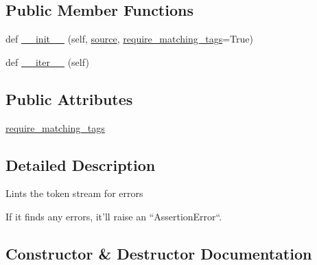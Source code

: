 \subsection*{Public Member Functions}
\begin{DoxyCompactItemize}
\item 
def \hyperlink{classpip_1_1__vendor_1_1html5lib_1_1filters_1_1lint_1_1Filter_ae88a5bdbdf8d1a1b8d03d32b7c8990b7}{\+\_\+\+\_\+init\+\_\+\+\_\+} (self, \hyperlink{classpip_1_1__vendor_1_1html5lib_1_1filters_1_1base_1_1Filter_aedf7f8b39d6bd2b443f81db8fcc14060}{source}, \hyperlink{classpip_1_1__vendor_1_1html5lib_1_1filters_1_1lint_1_1Filter_a5ef2fa2f4248e04ff87b8f17b609820c}{require\+\_\+matching\+\_\+tags}=True)
\item 
def \hyperlink{classpip_1_1__vendor_1_1html5lib_1_1filters_1_1lint_1_1Filter_aa8591a2818b00489e06da078ae97d205}{\+\_\+\+\_\+iter\+\_\+\+\_\+} (self)
\end{DoxyCompactItemize}
\subsection*{Public Attributes}
\begin{DoxyCompactItemize}
\item 
\hyperlink{classpip_1_1__vendor_1_1html5lib_1_1filters_1_1lint_1_1Filter_a5ef2fa2f4248e04ff87b8f17b609820c}{require\+\_\+matching\+\_\+tags}
\end{DoxyCompactItemize}


\subsection{Detailed Description}
\begin{DoxyVerb}Lints the token stream for errors

If it finds any errors, it'll raise an ``AssertionError``.\end{DoxyVerb}
 

\subsection{Constructor \& Destructor Documentation}
\mbox{\label{classpip_1_1__vendor_1_1html5lib_1_1filters_1_1lint_1_1Filter_ae88a5bdbdf8d1a1b8d03d32b7c8990b7}} 
